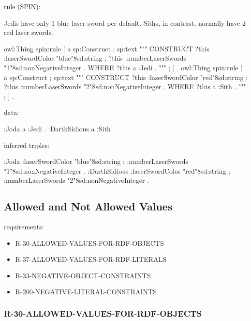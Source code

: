 \documentclass{llncs}
\begin{document}
rule (SPIN):

Jedis have only 1 blue laser sword per default.
Siths, in contrast, normally have 2 red laser swords.

\begin{ex}
owl:Thing
    spin:rule [
        a sp:Construct ;
            sp:text """
                CONSTRUCT {            
                    ?this :laserSwordColor "blue"^^xsd:string ;
                    ?this :numberLaserSwords "1"^^xsd:nonNegativeInteger . 
                }
                WHERE {             
                    ?this a :Jedi .            
                } """ ; ] .
owl:Thing
    spin:rule [
        a sp:Construct ;
            sp:text """
                CONSTRUCT {
                    ?this :laserSwordColor "red"^^xsd:string ;
                    ?this :numberLaserSwords "2"^^xsd:nonNegativeInteger . 
                }
                WHERE {             
                    ?this a :Sith .            
                } """ ; ] .
\end{ex}

data:

\begin{ex}
:Joda a :Jedi .
:DarthSidious a :Sith .
\end{ex}

inferred triples:

\begin{ex}
:Joda 
    :laserSwordColor "blue"^^xsd:string ;
    :numberLaserSwords "1"^^xsd:nonNegativeInteger .
:DarthSidious 
    :laserSwordColor "red"^^xsd:string ;
    :numberLaserSwords "2"^^xsd:nonNegativeInteger .
\end{ex}

\subsection{Allowed and Not Allowed Values}

requirements:

\begin{itemize}
	\item R-30-ALLOWED-VALUES-FOR-RDF-OBJECTS
  \item R-37-ALLOWED-VALUES-FOR-RDF-LITERALS
  \item R-33-NEGATIVE-OBJECT-CONSTRAINTS
	\item R-200-NEGATIVE-LITERAL-CONSTRAINTS
\end{itemize}

\subsubsection{R-30-ALLOWED-VALUES-FOR-RDF-OBJECTS}
\end{document}
